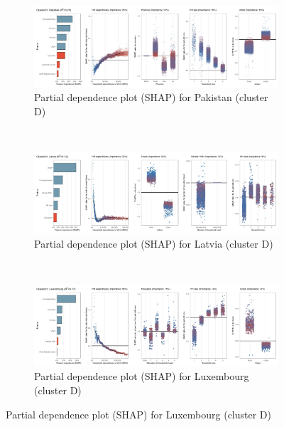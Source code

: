 \begin{figure}[ht!]\ContinuedFloat
    \centering
   \begin{subfigure}[b]{\textwidth}
         \centering
         \caption{Partial dependence plot (SHAP) for Pakistan (cluster D)}
         \label{fig:5b_PAK}
         \includegraphics[width=\textwidth]{Figure 5b/Figure_5b_PAK}         
     \end{subfigure}
    \\
    \vspace{0.5cm}
   \begin{subfigure}[b]{\textwidth}
         \centering
         \caption{Partial dependence plot (SHAP) for Latvia (cluster D)}
         \label{fig:5b_LVA}
         \includegraphics[width=\textwidth]{Figure 5b/Figure_5b_LVA}         
     \end{subfigure}
    \\
    \vspace{0.5cm}
   \begin{subfigure}[b]{\textwidth}
         \centering
         \caption{Partial dependence plot (SHAP) for Luxembourg (cluster D)}
         \label{fig:5b_LUX}
         \includegraphics[width=\textwidth]{Figure 5b/Figure_5b_LUX}

\end{subfigure}
\end{figure}
